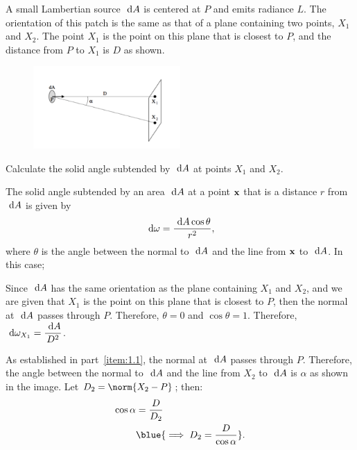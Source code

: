 \begin{problem}
  A small Lambertian source $\text{ d} A$ is centered at $P$
  and emits radiance $L$. The orientation of this patch is the same
  as that of a plane containing two points, $X_1$ and $X_2$.
  The point $X_1$ is the point on this plane that is closest to $P$,
  and the distance from $P$ to $X_1$ is $D$ as shown.
  \begin{figure}[H]
    \centering
    \includegraphics[width=0.5\textwidth]{figures/lambertian.png}
    \label{fig:1}
  \end{figure}
  \begin{enumroman}
    \newpage
    \item Calculate the solid angle subtended by $\text{ d} A$ at points $X_1$ and $X_2$.
      \begin{answer}
        The solid angle subtended by an area $\text{ d} A$ at a point $\mathbf{x}$ that is a distance
        $r$ from $\text{ d} A$ is given by
        \[ \text{ d}\omega = \frac{\text{ d} A \cos\theta}{r^2}, \]
        where $\theta$ is the angle between the normal to $\text{ d} A$
        and the line from $\mathbf{x}$ to $\text{ d} A$.
        In this case;
        \begin{enumarabic}
          \item Since $\text{ d} A$ has the same orientation as the plane containing $X_1$ and $X_2$,
            and we are given that $X_1$ is the point on this plane that is closest to $P$,
            then the normal at $\text{ d} A$ passes through $P$.
            Therefore, $\theta = 0$ and $\cos\theta = 1$.
            Therefore, $\displaystyle \text{ d} \omega_{X_1} = \frac{\text{ d} A}{D^2}$.~\label{item:1.1}
          \item As established in part~\ref{item:1.1}, the normal at $\text{ d} A$ passes through $P$.
            Therefore, the angle between the normal to $\text{ d} A$ and the line from $X_2$ to $\text{ d} A$
            is $\alpha$ as shown in the image.
            Let $D_2 = \norm{X_2 - P}$; then:
            \begin{align*}
              \cos\alpha &= \frac{D}{D_2} \\
              &\blue{\implies D_2 = \frac{D}{\cos\alpha}}.
            \end{align*}

\end{enumarabic}
\end{answer}
\end{enumroman}
\end{problem}
